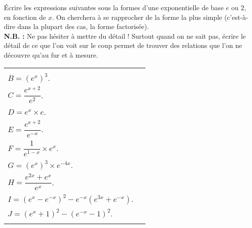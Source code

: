 Écrire les expressions suivantes sous la formes d'une exponentielle de base $e$ ou $2$, en fonction de $x$. On cherchera à se rapprocher de la forme la plus simple (c'est-à-dire dans la plupart des cas, la forme factorisée). \\

\textbf{N.B. :} Ne pas hésiter à mettre du détail ! Surtout quand on ne sait pas, écrire le détail de ce que l'on voit sur le coup permet de trouver des relations que l'on ne découvre qu'au fur et à mesure. \\

\begin{tabular}{ll}
\begin{minipage}{7.3cm}
\begin{itemize}
\item[•] $A = e^5 \times e^{-2} \times e^3$. \vspace*{.3cm} \\
\item[•] $B = \left(e^x\right)^3$. \vspace*{.3cm} \\
\item[•] $C = \dfrac{e^{x+2}}{e^2}$. \vspace*{.3cm} \\
\item[•] $D = e^x \times e$. \vspace*{.3cm} \\
\item[•] $E = \dfrac{e^{x+2}}{e^{-x}}$. \vspace*{.3cm} \\
\item[•] $F = \dfrac{1}{e^{1-x}} \times e^x$. \vspace*{.3cm} \\
\item[•] $G = \left(e^x\right)^3 \times e^{-4x}$. \vspace*{.3cm} \\
\item[•] $H = \dfrac{e^{2x} + e^x}{e^x}$. \vspace*{.3cm} \\
\item[•] $I = \left(e^x - e^{-x}\right)^2 - e^{-x}\left(e^{3x} + e^{-x}\right)$.\vspace*{.3cm} \\ 
\item[•] $J = \left(e^x + 1\right)^2 - \left(e^{-x} - 1\right)^2$. \vspace*{.3cm} \\

\end{itemize}
\end{minipage}
\end{tabular}
